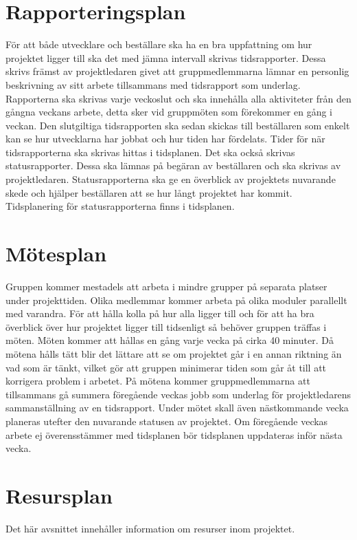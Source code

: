 \documentclass[projektplan/plan.tex]{subfiles}
\begin{document}
\section{Rapporteringsplan}
För att både utvecklare och beställare ska ha en bra uppfattning om hur
projektet ligger till ska det med jämna intervall skrivas tidsrapporter. Dessa
skrivs främst av projektledaren givet att gruppmedlemmarna lämnar en personlig
beskrivning av sitt arbete tillsammans med tidsrapport som underlag.
Rapporterna ska skrivas varje veckoslut och ska innehålla alla aktiviteter från
den gångna veckans arbete, detta sker vid gruppmöten som förekommer en gång i
veckan. Den slutgiltiga tidsrapporten ska sedan skickas till beställaren som
enkelt kan se hur utvecklarna har jobbat och hur tiden har fördelats. Tider för
när tidsrapporterna ska skrivas hittas i tidsplanen. Det ska också skrivas
statusrapporter. Dessa ska lämnas på begäran av beställaren och ska skrivas av
projektledaren. Statusrapporterna ska ge en överblick av projektets nuvarande
skede och hjälper beställaren att se hur långt projektet har kommit.
Tidsplanering för statusrapporterna finns i tidsplanen.

\section{Mötesplan}
Gruppen kommer mestadels att arbeta i mindre grupper på separata platser under
projekttiden. Olika medlemmar kommer arbeta på olika moduler parallellt med
varandra. För att hålla kolla på hur alla ligger till och för att ha bra
överblick över hur projektet ligger till tidsenligt så behöver gruppen träffas
i möten. Möten kommer att hållas en gång varje vecka på cirka 40 minuter. Då
mötena hålls tätt blir det lättare att se om projektet går i en annan riktning
än vad som är tänkt, vilket gör att gruppen minimerar tiden som går åt till att
korrigera problem i arbetet. På mötena kommer gruppmedlemmarna att tillsammans
gå summera föregående veckas jobb som underlag för projektledarens
sammanställning av en tidsrapport. Under mötet skall även nästkommande vecka
planeras utefter den nuvarande statusen av projektet. Om föregående veckas
arbete ej överensstämmer med tidsplanen bör tidsplanen uppdateras inför nästa
vecka.

\section{Resursplan}
Det här avsnittet innehåller information om resurser inom projektet.
\end{document}
